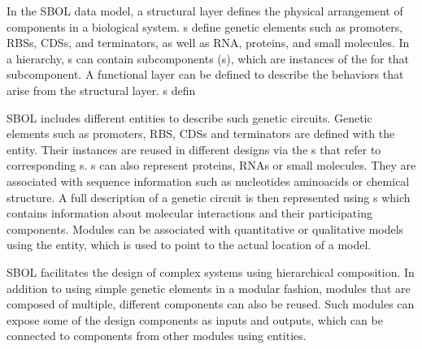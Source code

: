 In the SBOL data model, a structural layer defines the physical arrangement of components in a biological system.  s define genetic elements such as promoters, RBSs, CDSs, and terminators, as well as RNA, proteins, and small molecules.  In a hierarchy, s can contain subcomponents (s), which are instances of the  for that subcomponent.  A functional layer can be defined to describe the behaviors that arise from the structural layer.  s defin


SBOL includes different entities to describe such genetic circuits. Genetic elements such as promoters, RBS, CDSs and terminators are defined with the  entity. Their instances are reused in different designs via the s that refer to corresponding s. s can also represent proteins, RNAs or small molecules. They are associated with sequence information such as nucleotides aminoacids or chemical structure. A full description of a genetic circuit is then represented using  s which contains information about molecular interactions and their participating components. Modules can be associated with quantitative or qualitative models using the  entity, which is used to point to the actual location of a model.


SBOL facilitates the design of complex systems using hierarchical composition. In addition to using simple genetic elements in a modular fashion, modules that are composed of multiple, different components can also be reused. Such modules can expose some of the design components as inputs and outputs, which can be connected to components from other modules using  entities.




